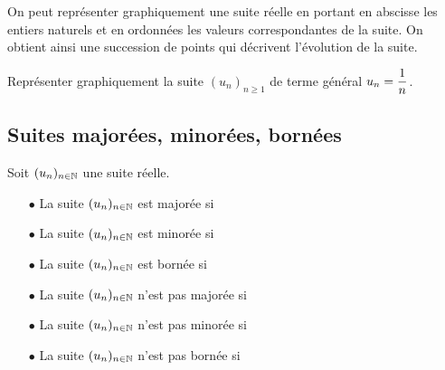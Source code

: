 \documentclass[a4paper, 11pt]{article}
\begin{document}
 On peut repr\'esenter graphiquement une suite r\'eelle en portant en abscisse les entiers naturels et en ordonn\'ees les valeurs correspondantes de la suite. On obtient ainsi une succession de points qui d\'ecrivent l'\'evolution de la suite.

\begin{exemple}
Repr\'esenter graphiquement la suite $(u_n)_{n\geq 1}$ de terme g\'en\'eral $u_n=\displaystyle \frac{1}{n}$. 
\end{exemple}
\subsection{Suites major\'ees, minor\'ees, born\'ees}



\begin{defi} Soit $(u_n)_{n\in \mathbb{N}}$ une suite r\'eelle. 
\begin{itemize}
\item[$\bullet$] La suite $(u_n)_{n\in \mathbb{N}}$ est major\'ee si \dotfill \vspace{0.3cm}
\item[$\bullet$] La suite $(u_n)_{n\in \mathbb{N}}$ est minor\'ee si \dotfill \vspace{0.3cm}
\item[$\bullet$] La suite $(u_n)_{n\in \mathbb{N}}$ est born\'ee si \dotfill
\end{itemize}
\end{defi}



{\footnotesize 
\begin{exercice}
\begin{itemize}
\item[$\bullet$] La suite $(u_n)_{n\in \mathbb{N}}$ n'est pas major\'ee si \dotfill \vspace{0.3cm}
\item[$\bullet$] La suite $(u_n)_{n\in \mathbb{N}}$ n'est pas minor\'ee si \dotfill \vspace{0.3cm}
\item[$\bullet$] La suite $(u_n)_{n\in \mathbb{N}}$ n'est pas born\'ee si \dotfill
\end{itemize}
\end{exercice}}
\end{document}
